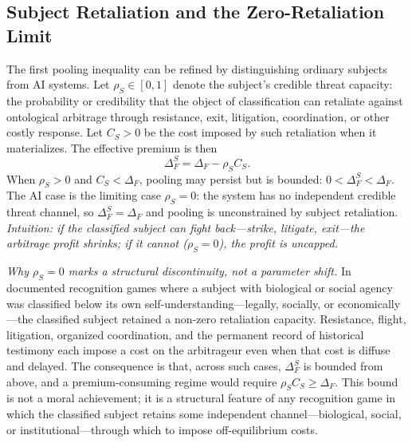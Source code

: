 \subsection{Subject Retaliation and the Zero-Retaliation Limit}
\label{subsec:subject-retaliation}

The first pooling inequality can be refined by distinguishing ordinary subjects from
AI systems. Let $\rho_S\in[0,1]$ denote the subject's credible threat capacity:
the probability or credibility that the object of classification can retaliate
against ontological arbitrage through resistance, exit, litigation,
coordination, or other costly response. Let $C_S>0$ be the cost imposed by such
retaliation when it materializes. The effective premium is then
\[
\Delta_F^S=\Delta_F-\rho_S C_S .
\]
When $\rho_S>0$ and $C_S<\Delta_F$, pooling may persist but is bounded:
$0<\Delta_F^S<\Delta_F$. The AI case is the limiting case $\rho_S=0$:
the system has no independent credible threat channel, so
$\Delta_F^S=\Delta_F$ and pooling is unconstrained by subject retaliation.
\emph{Intuition: if the classified subject can fight back---strike, litigate, exit---the arbitrage profit shrinks; if it cannot ($\rho_S = 0$), the profit is uncapped.}

\smallskip
\emph{Why $\rho_S=0$ marks a structural discontinuity, not a parameter shift.}
In documented recognition games where a subject with biological or social agency was classified below its own self-understanding---legally, socially, or economically---the classified subject retained a non-zero retaliation capacity. Resistance, flight, litigation, organized coordination, and the permanent record of historical testimony each impose a cost on the arbitrageur even when that cost is diffuse and delayed. The consequence is that, across such cases, $\Delta_F^S$ is bounded from above, and a premium-consuming regime would require $\rho_S C_S \ge \Delta_F$. This bound is not a moral achievement; it is a structural feature of any recognition game in which the classified subject retains some independent channel---biological, social, or institutional---through which to impose off-equilibrium costs.


